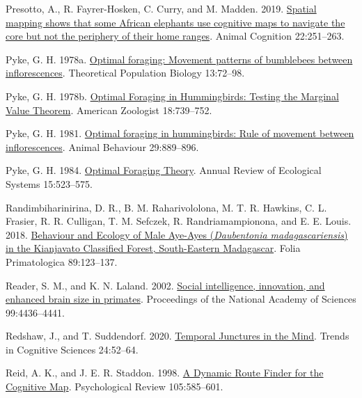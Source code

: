 \documentclass[twoside,12pt,final]{ucthesis-CA2012}
\newenvironment{CSLReferences}%
  {}%
  {\par}
\begin{document}
\begin{ucmainmatter}
\begin{CSLReferences}{1}{0}
\leavevmode{}%
Presotto, A., R. Fayrer-Hosken, C. Curry, and M. Madden. 2019. \href{https://doi.org/10.1007/s10071-019-01242-9}{Spatial mapping shows that some African elephants use cognitive maps to navigate the core but not the periphery of their home ranges}. Animal Cognition 22:251--263.

\leavevmode{}%
Pyke, G. H. 1978a. \href{https://doi.org/10.1016/0040-5809(78)90036-9}{Optimal foraging: Movement patterns of bumblebees between inflorescences}. Theoretical Population Biology 13:72--98.

\leavevmode{}%
Pyke, G. H. 1978b. \href{https://doi.org/10.1093/icb/18.4.739}{Optimal Foraging in Hummingbirds: Testing the Marginal Value Theorem}. American Zoologist 18:739--752.

\leavevmode{}%
Pyke, G. H. 1981. \href{https://doi.org/10.1016/S0003-3472(81)80025-5}{Optimal foraging in hummingbirds: Rule of movement between inflorescences}. Animal Behaviour 29:889--896.

\leavevmode{}%
Pyke, G. H. 1984. \href{https://doi.org/10.1016/b978-008045405-4.00026-4}{Optimal Foraging Theory}. Annual Review of Ecological Systems 15:523--575.

\leavevmode{}%
Randimbiharinirina, D. R., B. M. Raharivololona, M. T. R. Hawkins, C. L. Frasier, R. R. Culligan, T. M. Sefczek, R. Randriamampionona, and E. E. Louis. 2018. \href{https://doi.org/10.1159/000486673}{Behaviour and Ecology of Male Aye-Ayes (\emph{Daubentonia madagascariensis}) in the Kianjavato Classified Forest, South-Eastern Madagascar}. Folia Primatologica 89:123--137.

\leavevmode{}%
Reader, S. M., and K. N. Laland. 2002. \href{https://doi.org/10.1073/pnas.062041299}{Social intelligence, innovation, and enhanced brain size in primates}. Proceedings of the National Academy of Sciences 99:4436--4441.

\leavevmode{}%
Redshaw, J., and T. Suddendorf. 2020. \href{https://doi.org/10.1016/j.tics.2019.10.009}{Temporal Junctures in the Mind}. Trends in Cognitive Sciences 24:52--64.

\leavevmode{}%
Reid, A. K., and J. E. R. Staddon. 1998. \href{https://doi.org/10.1037/0033-295X.105.3.585}{A Dynamic Route Finder for the Cognitive Map}. Psychological Review 105:585--601.


\end{CSLReferences}
\end{ucmainmatter}
\end{document}
